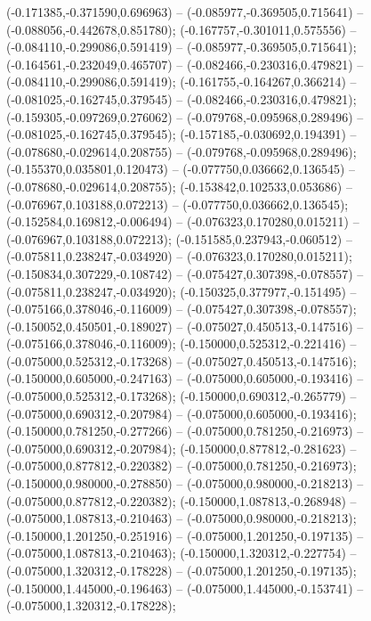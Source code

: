  (-0.171385,-0.371590,0.696963) -- (-0.085977,-0.369505,0.715641) -- (-0.088056,-0.442678,0.851780);
 (-0.167757,-0.301011,0.575556) -- (-0.084110,-0.299086,0.591419) -- (-0.085977,-0.369505,0.715641);
 (-0.164561,-0.232049,0.465707) -- (-0.082466,-0.230316,0.479821) -- (-0.084110,-0.299086,0.591419);
 (-0.161755,-0.164267,0.366214) -- (-0.081025,-0.162745,0.379545) -- (-0.082466,-0.230316,0.479821);
 (-0.159305,-0.097269,0.276062) -- (-0.079768,-0.095968,0.289496) -- (-0.081025,-0.162745,0.379545);
 (-0.157185,-0.030692,0.194391) -- (-0.078680,-0.029614,0.208755) -- (-0.079768,-0.095968,0.289496);
 (-0.155370,0.035801,0.120473) -- (-0.077750,0.036662,0.136545) -- (-0.078680,-0.029614,0.208755);
 (-0.153842,0.102533,0.053686) -- (-0.076967,0.103188,0.072213) -- (-0.077750,0.036662,0.136545);
 (-0.152584,0.169812,-0.006494) -- (-0.076323,0.170280,0.015211) -- (-0.076967,0.103188,0.072213);
 (-0.151585,0.237943,-0.060512) -- (-0.075811,0.238247,-0.034920) -- (-0.076323,0.170280,0.015211);
 (-0.150834,0.307229,-0.108742) -- (-0.075427,0.307398,-0.078557) -- (-0.075811,0.238247,-0.034920);
 (-0.150325,0.377977,-0.151495) -- (-0.075166,0.378046,-0.116009) -- (-0.075427,0.307398,-0.078557);
 (-0.150052,0.450501,-0.189027) -- (-0.075027,0.450513,-0.147516) -- (-0.075166,0.378046,-0.116009);
 (-0.150000,0.525312,-0.221416) -- (-0.075000,0.525312,-0.173268) -- (-0.075027,0.450513,-0.147516);
 (-0.150000,0.605000,-0.247163) -- (-0.075000,0.605000,-0.193416) -- (-0.075000,0.525312,-0.173268);
 (-0.150000,0.690312,-0.265779) -- (-0.075000,0.690312,-0.207984) -- (-0.075000,0.605000,-0.193416);
 (-0.150000,0.781250,-0.277266) -- (-0.075000,0.781250,-0.216973) -- (-0.075000,0.690312,-0.207984);
 (-0.150000,0.877812,-0.281623) -- (-0.075000,0.877812,-0.220382) -- (-0.075000,0.781250,-0.216973);
 (-0.150000,0.980000,-0.278850) -- (-0.075000,0.980000,-0.218213) -- (-0.075000,0.877812,-0.220382);
 (-0.150000,1.087813,-0.268948) -- (-0.075000,1.087813,-0.210463) -- (-0.075000,0.980000,-0.218213);
 (-0.150000,1.201250,-0.251916) -- (-0.075000,1.201250,-0.197135) -- (-0.075000,1.087813,-0.210463);
 (-0.150000,1.320312,-0.227754) -- (-0.075000,1.320312,-0.178228) -- (-0.075000,1.201250,-0.197135);
 (-0.150000,1.445000,-0.196463) -- (-0.075000,1.445000,-0.153741) -- (-0.075000,1.320312,-0.178228);
